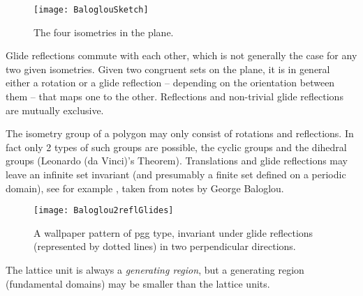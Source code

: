 \begin{description}
\begin{description}
{%
\begin{figure}
  \centering
  \texttt{[image: BaloglouSketch]}
  \caption{
The four isometries in the plane.
  }\label{fig:BaloglouSketch}
\end{figure}

Glide reflections commute with each other, which is not generally the
case for any two given isometries. Given two
congruent sets on the plane, it is in general either a rotation or a
glide reflection -- depending on the orientation between them -- that
maps one to the other. Reflections and non-trivial glide reflections are
mutually exclusive.

The isometry group of a polygon may only consist of rotations and
reflections. In fact only 2 types of such groups are possible, the cyclic
groups  and the dihedral groups  (Leonardo (da Vinci)'s Theorem).
Translations and glide reflections may leave an infinite set invariant
(and presumably a finite set defined on a periodic domain),
see for example , taken from notes by
George Baloglou.

\begin{figure}
  \centering
  \texttt{[image: Baloglou2reflGlides]}
  \caption{
A wallpaper pattern of pgg type,
invariant under glide reflections (represented by dotted
lines) in two perpendicular directions.
  }\label{fig:Baloglou2reflGlides}
\end{figure}


The lattice unit is always a \emph{generating region}, but a generating
region (fundamental domains) may be smaller than the lattice units.
    }

\end{description}
\end{description}
